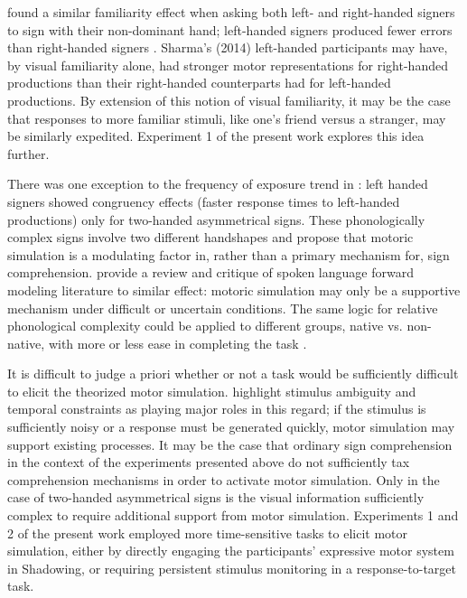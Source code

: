              found a similar familiarity effect when asking both left- and right-handed signers to sign with their non-dominant hand; left-handed signers produced fewer errors than right-handed signers \cite<as cited by>[]{shield2018}. Sharma’s (2014) left-handed participants may have, by visual familiarity alone, had stronger motor representations for right-handed productions than their right-handed counterparts had for left-handed productions. By extension of this notion of visual familiarity, it may be the case that responses to more familiar stimuli, like one’s friend versus a stranger, may be similarly expedited. Experiment 1 of the present work explores this idea further. \par
            There was one exception to the frequency of exposure trend in : left handed signers showed congruency effects (faster response times to left-handed productions) only for two-handed asymmetrical signs. These phonologically complex signs involve two different handshapes and  propose that motoric simulation is a modulating factor in, rather than a primary mechanism for, sign comprehension.  provide a review and critique of spoken language forward modeling literature to similar effect: motoric simulation may only be a supportive mechanism under difficult or uncertain conditions. The same logic for relative phonological complexity could be applied to different groups, native vs. non-native, with more or less ease in completing the task \cite{corina2016}. \par
            It is difficult to judge a priori whether or not a task would be sufficiently difficult to elicit the theorized motor simulation.  highlight stimulus ambiguity and temporal constraints as playing major roles in this regard; if the stimulus is sufficiently noisy or a response must be generated quickly, motor simulation may support existing processes. It may be the case that ordinary sign comprehension in the context of the experiments presented above \cite{watkins2017, corina2016} do not sufficiently tax comprehension mechanisms in order to activate motor simulation. Only in the case of two-handed asymmetrical signs is the visual information sufficiently complex to require additional support from motor simulation. Experiments 1 and 2 of the present work employed more time-sensitive tasks to elicit motor simulation, either by directly engaging the participants’ expressive motor system in Shadowing, or requiring persistent stimulus monitoring in a response-to-target task. 
